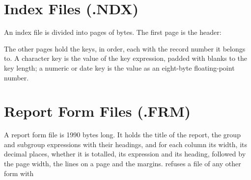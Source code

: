 \section{Index Files (.NDX)}
An index file is divided into pages of \FormatNDXPage{} bytes.  The first page
is the header:

The other pages hold the keys, in order, each with the record number it
belongs to.  A character key is the value of the key expression, padded with
blanks to the key length; a numeric or date key is the value as an eight-byte
floating-point number.

\section{Report Form Files (.FRM)}
A report form file is 1990 bytes long.  It holds the title of the report, the
group and subgroup expressions with their headings, and for each column its
width, its decimal places, whether it is totalled, its expression and its
heading, followed by the page width, the lines on a page and the margins.
 refuses a file of any other form with
